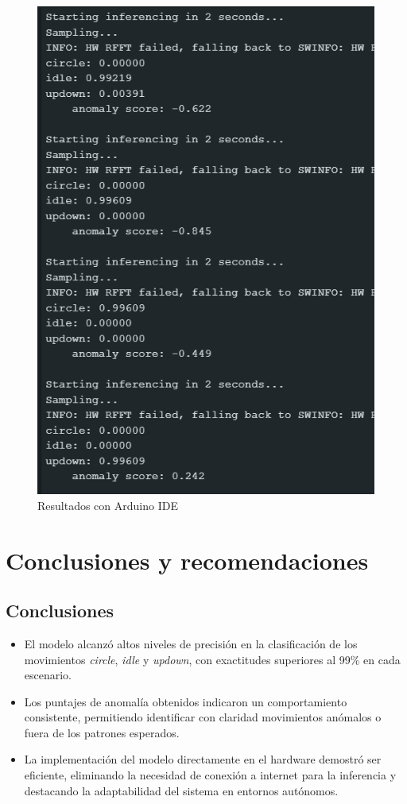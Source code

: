 \documentclass[12pt,a4paper]{article}
\begin{document}
\begin{figure}[H]
    \centering
    \includegraphics[width=0.5\linewidth]{Imagenes/results_2.png}
    \caption{Resultados con Arduino IDE}
    \label{fig:19}
\end{figure}


\section{Conclusiones y recomendaciones}
\subsection{Conclusiones}  
\begin{itemize}
    \item El modelo alcanzó altos niveles de precisión en la clasificación de los movimientos \textit{circle}, \textit{idle} y \textit{updown}, con exactitudes superiores al 99\% en cada escenario.  
    \item Los puntajes de anomalía obtenidos indicaron un comportamiento consistente, permitiendo identificar con claridad movimientos anómalos o fuera de los patrones esperados.  
    \item La implementación del modelo directamente en el hardware demostró ser eficiente, eliminando la necesidad de conexión a internet para la inferencia y destacando la adaptabilidad del sistema en entornos autónomos.  
\end{itemize}
\end{document}
